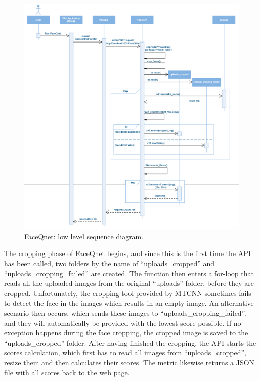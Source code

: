\begin{figure}[h]
    \centering
    \includegraphics[width=1\textwidth]{figures/FerdigLowLevel.png}
    \caption{FaceQnet: low level sequence diagram.}
    \label{fig:lowlevel}
\end{figure}

The cropping phase of FaceQnet begins, and since this is the first time the API has been called, two folders by the name of ``uploads\_cropped'' and ``uploads\_cropping\_failed'' are created. The function then enters a for-loop that reads all the uploaded images from the original ``uploads'' folder, before they are cropped. Unfortunately, the cropping tool provided by MTCNN sometimes fails to detect the face in the images which results in an empty image. An alternative scenario then occurs, which sends these images to ``uploads\_cropping\_failed'', and they will automatically be provided with the lowest score possible. If no exception happens during the face cropping, the cropped image is saved to the ``uploads\_cropped'' folder. After having finished the cropping, the API starts the scores calculation, which first has to read all images from ``uploads\_cropped'', resize them and then calculates their scores. The metric likewise returns a JSON file with all scores back to the web page.

